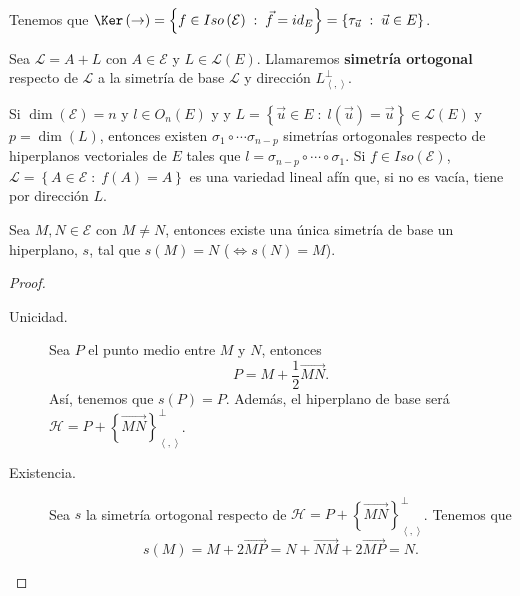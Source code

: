 \begin{observation}
	\normalfont Tenemos que $\displaystyle \Ker\left(\to \right) = \left\{ f \in Iso\left(\mathcal{E}\right) \; : \; \vec{f} = id _{E}\right\} = \left\{ \tau _{\vec{u}} \; : \; \vec{u} \in E\right\}  $.
\end{observation}
\begin{fdefinition}
\normalfont Sea $\displaystyle \mathcal{L} = A + L $ con $\displaystyle A \in \mathcal{E} $ y $\displaystyle L \in \mathcal{L}\left(E\right) $. Llamaremos \textbf{simetría ortogonal} respecto de $\displaystyle \mathcal{L} $ a la simetría de base $\displaystyle \mathcal{L} $ y dirección $\displaystyle L^{\perp }_{\left\langle ,  \right\rangle } $.
\end{fdefinition}
Si $\displaystyle \dim\left(\mathcal{E}\right) = n $ y $\displaystyle l \in O_{n}\left(E\right) $ y y $\displaystyle L = \left\{ \vec{u} \in E \; : \; l\left(\vec{u}\right) = \vec{u}\right\} \in \mathcal{L}\left(E\right) $ y $\displaystyle p = \dim\left(L\right) $, entonces existen $\displaystyle \sigma _{1} \circ \cdots \sigma_{n - p} $ simetrías ortogonales respecto de hiperplanos vectoriales de $\displaystyle E $ tales que $\displaystyle l = \sigma _{n-p} \circ \cdots \circ \sigma_{1} $.
Si $\displaystyle f \in Iso\left(\mathcal{E}\right) $, $\displaystyle \mathcal{L} = \left\{ A \in \mathcal{E} \; : \; f\left(A\right) = A\right\}  $ es una variedad lineal afín que, si no es vacía, tiene por dirección $\displaystyle L $. 
\begin{ftheorem}[]
\normalfont Sea $\displaystyle M,N \in \mathcal{E} $ con $\displaystyle M \neq N $, entonces existe una única simetría de base un hiperplano, $\displaystyle s $, tal que $\displaystyle s\left(M\right)= N $ ($\displaystyle  \iff s\left(N\right) = M $).
\end{ftheorem}
\begin{proof}
\begin{description}
\item[Unicidad.] Sea $\displaystyle P $ el punto medio entre $\displaystyle M $ y $\displaystyle N $, entonces
\[ P = M + \frac{1}{2}\overrightarrow{MN} .\]
Así, tenemos que $\displaystyle s\left(P\right) = P $. Además, el hiperplano de base será $\displaystyle \mathcal{H} = P + \left\{ \overrightarrow{MN}\right\} ^{\perp }_{\left\langle ,  \right\rangle} $.
\item[Existencia.] Sea $\displaystyle s $ la simetría ortogonal respecto de $\displaystyle \mathcal{H} = P + \left\{ \overrightarrow{MN}\right\} ^{\perp }_{\left\langle ,  \right\rangle } $. Tenemos que 
	\[s\left(M\right) = M + 2\overrightarrow{MP} = N + \overrightarrow{NM} + 2 \overrightarrow{MP} = N .\]
\end{description}
\end{proof}
